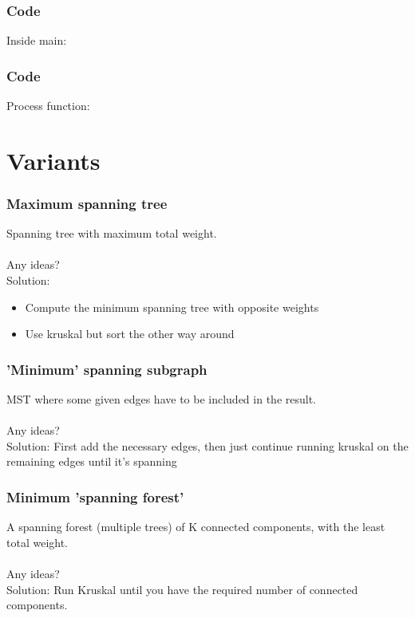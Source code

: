 \documentclass[12pt]{beamer}
\begin{document}
\begin{frame}
	\frametitle{Code}
	Inside main:\\
	
\end{frame}
\begin{frame}
\frametitle{Code}
Process function:\\

\end{frame}


\section{Variants}

\begin{frame}
	\frametitle{Maximum spanning tree}
	Spanning tree with maximum total weight.\\~\\
	Any ideas?\\
	\pause
	Solution: 
	\begin{itemize}
		\item Compute the minimum spanning tree with opposite weights
		\item Use kruskal but sort the other way around
	\end{itemize}
	
\end{frame}

\begin{frame}
	\frametitle{'Minimum' spanning subgraph}
	MST where some given edges have to be included in the result.\\~\\
	Any ideas?\\
	\pause
	Solution: First add the necessary edges, then just continue running kruskal on the remaining edges until it's spanning
	
\end{frame}

\begin{frame}
	\frametitle{Minimum 'spanning forest'}
	A spanning forest (multiple trees) of K connected components, with the least total weight.\\~\\
	Any ideas?\\
	\pause
	Solution: Run Kruskal until you have the required number of connected components.
	
\end{frame}
\end{document}

